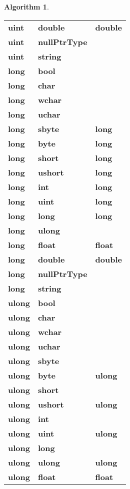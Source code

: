 \documentclass[a4paper,oneside,11pt]{book}
\theoremstyle{definition}
\newtheorem{algo}{Algorithm}[section]
\begin{document}
\begin{algo}
\begin{flushleft}
\begin{supertabular}{lll}
\textbf{uint}& \textbf{double}& \textbf{double}\\
\textbf{uint}& \textbf{nullPtrType}& \\
\textbf{uint}& \textbf{string}& \\
\hline
\textbf{long}& \textbf{bool}& \\
\textbf{long}& \textbf{char}& \\
\textbf{long}& \textbf{wchar}& \\
\textbf{long}& \textbf{uchar}& \\
\textbf{long}& \textbf{sbyte}& \textbf{long} \\
\textbf{long}& \textbf{byte}& \textbf{long} \\
\textbf{long}& \textbf{short}& \textbf{long} \\
\textbf{long}& \textbf{ushort}& \textbf{long}\\
\textbf{long}& \textbf{int}& \textbf{long}\\
\textbf{long}& \textbf{uint}& \textbf{long}\\
\textbf{long}& \textbf{long}& \textbf{long}\\
\textbf{long}& \textbf{ulong}& \\
\textbf{long}& \textbf{float}& \textbf{float}\\
\textbf{long}& \textbf{double}& \textbf{double}\\
\textbf{long}& \textbf{nullPtrType}& \\
\textbf{long}& \textbf{string}& \\
\hline
\textbf{ulong}& \textbf{bool}& \\
\textbf{ulong}& \textbf{char}& \\
\textbf{ulong}& \textbf{wchar}& \\
\textbf{ulong}& \textbf{uchar}& \\
\textbf{ulong}& \textbf{sbyte}& \\
\textbf{ulong}& \textbf{byte}& \textbf{ulong}\\
\textbf{ulong}& \textbf{short}& \\
\textbf{ulong}& \textbf{ushort}& \textbf{ulong}\\
\textbf{ulong}& \textbf{int}& \\
\textbf{ulong}& \textbf{uint}& \textbf{ulong}\\
\textbf{ulong}& \textbf{long}& \\
\textbf{ulong}& \textbf{ulong}& \textbf{ulong}\\
\textbf{ulong}& \textbf{float}& \textbf{float}\\

\end{supertabular}
\end{flushleft}
\end{algo}
\end{document}
